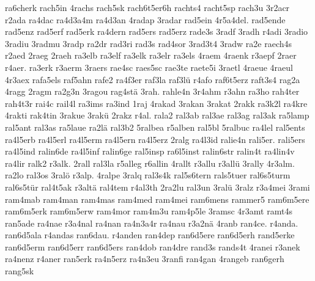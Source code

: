 {    ra6cherk
    rach5in
    4rachs
    rach5sk
    rach6t5er6h
    rachts4
    racht5sp
    rach3u
    3r2acr
    r2ada
    ra4dac
    ra4d3a4m
    ra4d3an
    4radap
    3radar
    rad5ein
    4r5a4del.
    rad5ende
    rad5enz
    rad5erf
    rad5erk
    ra4dern
    rad5ers
    rad5erz
    rade3s
    3radf
    3radh
    r4adi
    3radio
    3radiu
    3radmu
    3radp
    ra2dr
    rad3ri
    rad3s
    rad4sor
    3rad3t4
    3radw
    ra2e
    raech4s
    r2aed
    2raeg
    2raeh
    ra3elb
    ra3elf
    ra3elk
    ra3elr
    ra3els
    4raem
    4raenk
    r3aepf
    2raer
    r4aer.
    ra3erk
    r3aerm
    3raers
    rae4sc
    raes5sc
    rae3te
    raete5i
    3raetl
    4raeue
    4raeul
    4r3aex
    rafa5els
    raf5ahn
    rafe2
    ra4f3er
    raf3la
    raf3lü
    r4afo
    raf6t5erz
    raft3s4
    rag2a
    4ragg
    2ragm
    ra2g3n
    3ragou
    rag4stä
    3rah.
    rahle4n
    3r4ahm
    r3ahn
    ra3ho
    rah4ter
    rah4t3r
    rai4c
    rail4l
    ra3ims
    ra3ind
    1raj
    4rakad
    3rakan
    3rakat
    2rakk
    ra3k2l
    ra4kre
    4rakti
    rak4tin
    3rakue
    3rakü
    2rakz
    r4al.
    rala2
    ral3ab
    ral3ae
    ral3ag
    ral3ak
    ra5lamp
    ral5ant
    ral3as
    ra5laue
    ra2lä
    ral3b2
    5ralbea
    r5alben
    ral5bl
    5ralbuc
    ra4lel
    ral5ents
    ra4l5erb
    ra4l5erl
    ra4l5erm
    ra4l5ern
    ra4l5erz
    2ralg
    ra4l3id
    ralie4n
    rali5er.
    rali5ers
    ra4l5ind
    ralin6de
    ra4l5inf
    ralin6ge
    ral5insp
    ra6l5inst
    ralin6str
    ralin4t
    ra4lin4v
    ra4lir
    ralk2
    r3alk.
    2rall
    ral3la
    r5alleg
    r6allin
    4rallt
    r3allu
    r3allü
    3rally
    4r3alm.
    ra2lo
    ral3os
    3ralö
    r3alp.
    4ralpe
    3ralq
    ral3s4k
    ral5s6tern
    rals5tuer
    ral6s5turm
    ral6s5tür
    ral4t5ak
    r3altä
    ral4tem
    r4al3th
    2ra2lu
    ral3un
    3ralü
    3ralz
    r3a4mei
    3rami
    ram4mab
    ram4man
    ram4mas
    ram4med
    ram4mei
    ram6mens
    rammer5
    ram6m5ere
    ram6m5erk
    ram6m5erw
    ram4mor
    ram4m3u
    ram4p5le
    3ramsc
    4r3amt
    ramt4s
    ran5ade
    ra4nae
    r3a4nal
    ra4nan
    ra4n3a4r
    ra4nau
    r3a2nä
    4ranb
    ran4ce.
    r4anda.
    ran6d5ala
    r4andas
    ran6dau.
    r4anden
    ran4dep
    ran6d5ere
    ran6d5erh
    rand5erke
    ran6d5erm
    ran6d5err
    ran6d5ers
    ran4dob
    ran4dre
    rand3s
    rands4t
    4ranei
    r3anek
    ra4nenz
    r4aner
    ran5erk
    ra4n5erz
    ra4n3eu
    3ranfi
    ran4gan
    4rangeb
    ran6gerh
    rang5sk
}
